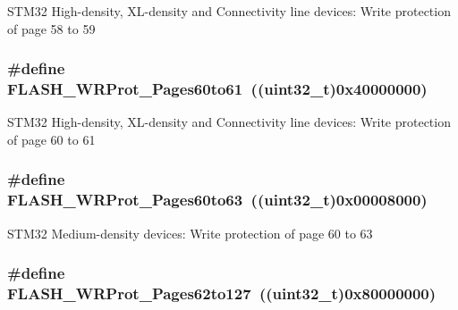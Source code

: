 \label{group__Option__Bytes__Write__Protection_ga4a05bf4eec7521ae90ff662db2a9f4f5}
STM32 High-\/density, XL-\/density and Connectivity line devices: Write protection of page 58 to 59 \hypertarget{group__Option__Bytes__Write__Protection_ga22f620be7f346efcb2cbb732b879fd0c}{
\subsubsection[{FLASH\_\-WRProt\_\-Pages60to61}]{\setlength{\rightskip}{0pt plus 5cm}\#define FLASH\_\-WRProt\_\-Pages60to61~((uint32\_\-t)0x40000000)}}
\label{group__Option__Bytes__Write__Protection_ga22f620be7f346efcb2cbb732b879fd0c}
STM32 High-\/density, XL-\/density and Connectivity line devices: Write protection of page 60 to 61 \hypertarget{group__Option__Bytes__Write__Protection_ga1978945fc02d1867900f17c4999c50d5}{
\subsubsection[{FLASH\_\-WRProt\_\-Pages60to63}]{\setlength{\rightskip}{0pt plus 5cm}\#define FLASH\_\-WRProt\_\-Pages60to63~((uint32\_\-t)0x00008000)}}
\label{group__Option__Bytes__Write__Protection_ga1978945fc02d1867900f17c4999c50d5}
STM32 Medium-\/density devices: Write protection of page 60 to 63 \hypertarget{group__Option__Bytes__Write__Protection_ga346285408d8f738796fc22d710777ba9}{
\subsubsection[{FLASH\_\-WRProt\_\-Pages62to127}]{\setlength{\rightskip}{0pt plus 5cm}\#define FLASH\_\-WRProt\_\-Pages62to127~((uint32\_\-t)0x80000000)}}
